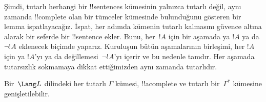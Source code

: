 \documentclass[../../../include/open-logic-section]{subfiles}
\begin{document}
      {}
      {}


\begin{explain}
Şimdi, tutarlı herhangi bir !!{sentence}s kümesinin yalnızca tutarlı
değil, aynı zamanda !!{complete} olan bir tümceler kümesinde
bulunduğunu gösteren bir lemma ispatlayacağız. İspat, her adımda kümenin
tutarlı kalmasını güvence altına alarak bir seferde bir !!{sentence}
ekler. Bunu, her~$!A$ için bir aşamada ya $!A$ ya da $\lnot !A$
eklenecek biçimde yaparız. Kuruluşun bütün aşamalarının birleşimi, her
$!A$ için ya $!A$'yı ya da değillemesi~$\lnot !A$'yı içerir ve bu
nedenle tamdır. Her aşamada tutarsızlık sokmamaya dikkat ettiğimizden
aynı zamanda tutarlıdır.
\end{explain}

\begin{lem}
 Bir~$\Lang L$ dilindeki her tutarlı
$\Gamma$ kümesi, !!a{complete} ve tutarlı bir~$\Gamma^*$ kümesine
genişletilebilir.
\end{lem}
\end{document}
